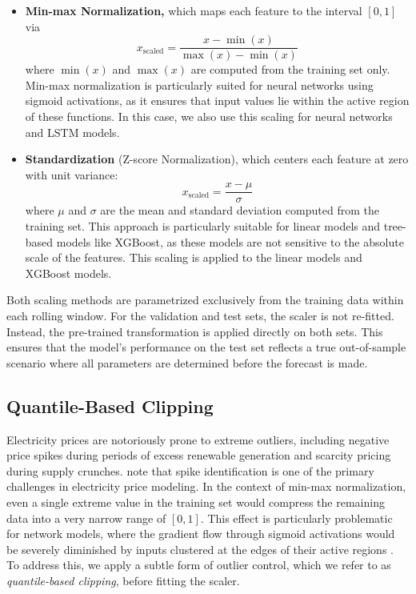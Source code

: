 \documentclass[preprint,12pt,nonatbib]{elsarticle}
\begin{document}
\begin{itemize}[noitemsep]
    \item \textbf{Min-max Normalization,} which maps each feature to the interval \([0,1]\) via
    \begin{equation}
        x_{\text{scaled}} = \frac{x - \min(x)}{\max(x) - \min(x)}
    \end{equation}
    where \(\min(x)\) and \(\max(x)\) are computed from the training set only.
Min-max normalization is particularly suited for neural networks using sigmoid activations, as it ensures that input values lie within the active region of these functions.
In this case, we also use this scaling for neural networks and LSTM models.

\bigskip

    \item \textbf{Standardization} (Z-score Normalization), which centers each feature at zero with unit variance:
    \begin{equation}
        x_{\text{scaled}} = \frac{x - \mu}{\sigma}
    \end{equation}
    where \(\mu\) and \(\sigma\) are the mean and standard deviation computed from the training set.
    This approach is particularly suitable for linear models and tree-based models like XGBoost, as these models are not sensitive to the absolute scale of the features.
    This scaling is applied to the linear models and XGBoost models.

\end{itemize}

Both scaling methods are parametrized exclusively from the training data within each rolling window.
For the validation and test sets, the scaler is not re-fitted. Instead, the pre-trained transformation is applied directly on both sets.
This ensures that the model's performance on the test set reflects a true out-of-sample scenario where all parameters are determined before the forecast is made.

\subsection{Quantile-Based Clipping}
\label{sub:Clipping}

Electricity prices are notoriously prone to extreme outliers, including negative price spikes during periods of excess renewable generation and scarcity pricing during supply crunches.
\cite{Janczura.2013} note that spike identification is one of the primary challenges in electricity price modeling.
In the context of min-max normalization, even a single extreme value in the training set would compress the remaining data into a very narrow range of \([0,1]\).
This effect is particularly problematic for network models, where the gradient flow through sigmoid activations would be severely diminished by inputs clustered at the edges of their active regions \cite{Lago.2018}.
To address this, we apply a subtle form of outlier control, which we refer to as \emph{quantile-based clipping}, before fitting the scaler.
\end{document}
